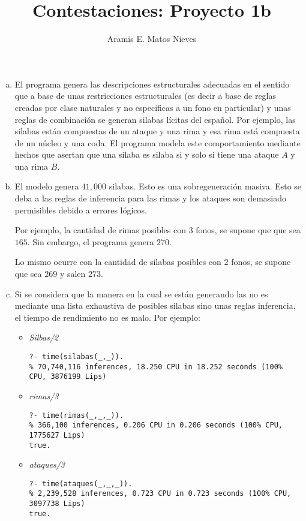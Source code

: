 \documentclass[12pt]{article}
\title{Contestaciones: Proyecto 1b}
\author{Aramis E. Matos Nieves}
\date{}
\begin{document}
\maketitle

\begin{enumerate}[a)]
    \item El programa genera las descripciones estructurales adecuadas en el sentido que a base de unas restricciones estructurales (es decir a base de reglas creadas por clase naturales y no especificas a un fono en particular) y unas reglas de combinación se generan silabas lícitas del español. Por ejemplo, las silabas están compuestas de un ataque y una rima y esa rima está compuesta de un núcleo y una coda. El programa modela este comportamiento mediante hechos que asertan que una silaba es silaba si y solo si tiene una ataque $A$ y una rima $B$.
    \item El modelo genera $41,000$ silabas. Esto es una sobregeneración masiva. Esto se deba a las reglas de inferencia para las rimas y los ataques son demasiado permisibles debido a errores lógicos.

          Por ejemplo, la cantidad de rimas posibles con $3$ fonos, se supone que que sea $165$. Sin embargo, el programa genera $270$.

          Lo mismo ocurre con la cantidad de silabas posibles con $2$ fonos, se supone que sea $269$ y salen $273$.

    \item Si se considera que la manera en la cual se están generando las no es mediante una lista exhaustiva de posibles silabas sino unas reglas inferencia, el tiempo de rendimiento no es malo. Por ejemplo:
          \begin{itemize}
              \item \textit{Silbas/2}
                    \begin{lstlisting}
?- time(silabas(_,_)).
% 70,740,116 inferences, 18.250 CPU in 18.252 seconds (100% CPU, 3876199 Lips)
        \end{lstlisting}
              \item \textit{rimas/3}
                    \begin{lstlisting}
?- time(rimas(_,_,_)).
% 366,100 inferences, 0.206 CPU in 0.206 seconds (100% CPU, 1775627 Lips)
true.
            \end{lstlisting}
              \item \textit{ataques/3}
                    \begin{lstlisting}
?- time(ataques(_,_,_)).
% 2,239,528 inferences, 0.723 CPU in 0.723 seconds (100% CPU, 3097738 Lips)
true.
            \end{lstlisting}
          \end{itemize}


\end{enumerate}
\end{document}
